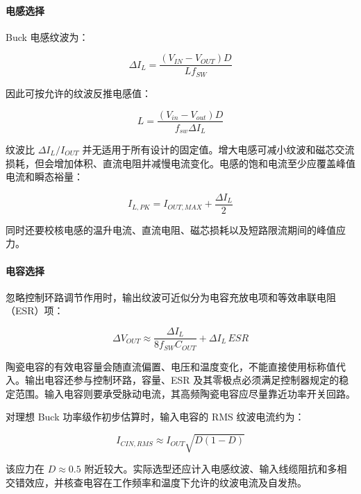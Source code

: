 \paragraph{电感选择}

Buck 电感纹波为：

\begin{equation}
\Delta I_L = \frac{(V_{IN}-V_{OUT})D}{L f_{SW}} \label{eq:buck-inductor-ripple}
\end{equation}

因此可按允许的纹波反推电感值：

\begin{equation}
L = \frac{(V_{in} - V_{out}) D}{f_{sw} \Delta I_L} \label{eq:inductor-selection}
\end{equation}

纹波比 $\Delta I_L/I_{OUT}$ 并无适用于所有设计的固定值。增大电感可减小纹波和磁芯交流损耗，但会增加体积、直流电阻并减慢电流变化。电感的饱和电流至少应覆盖峰值电流和瞬态裕量：

\begin{equation}
I_{L,PK}=I_{OUT,MAX}+\frac{\Delta I_L}{2} \label{eq:buck-inductor-peak}
\end{equation}

同时还要校核电感的温升电流、直流电阻、磁芯损耗以及短路限流期间的峰值应力。

\paragraph{电容选择}

忽略控制环路调节作用时，输出纹波可近似分为电容充放电项和等效串联电阻（ESR）项：

\begin{equation}
\Delta V_{OUT}\approx
\frac{\Delta I_L}{8f_{SW}C_{OUT}}+
\Delta I_L\,ESR \label{eq:buck-output-ripple}
\end{equation}

陶瓷电容的有效电容量会随直流偏置、电压和温度变化，不能直接使用标称值代入。输出电容还参与控制环路，容量、ESR 及其零极点必须满足控制器规定的稳定范围。输入电容则要承受脉动电流，其高频陶瓷电容应尽量靠近功率开关回路。

对理想 Buck 功率级作初步估算时，输入电容的 RMS 纹波电流约为：

\begin{equation}
I_{CIN,RMS}\approx I_{OUT}\sqrt{D(1-D)} \label{eq:buck-input-cap-rms}
\end{equation}

该应力在 $D\approx 0.5$ 附近较大。实际选型还应计入电感纹波、输入线缆阻抗和多相交错效应，并核查电容在工作频率和温度下允许的纹波电流及自发热。

